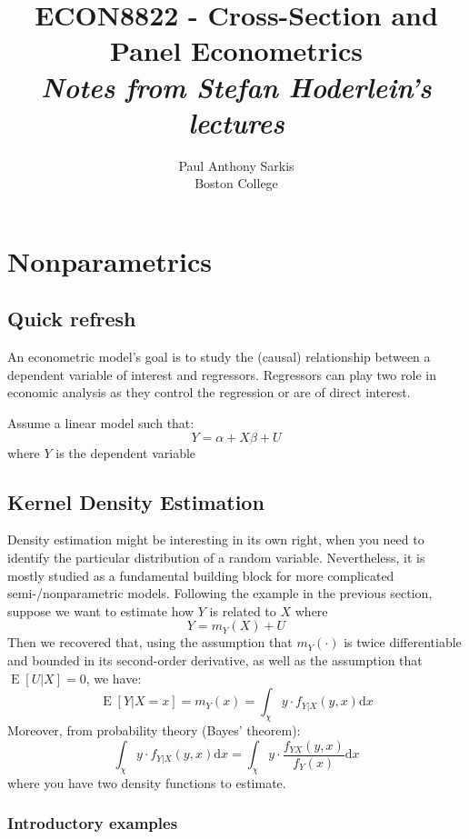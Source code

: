 \documentclass[12pt]{report}
\def\D{\mathrm{d}}
\newcommand{\E}[1]{\operatorname{E}\left[#1\right]}
\def\D{\mathrm{d}}
\def\D{\mathrm{d}}
\begin{document}
\date{}
\title{\textbf{\huge{ECON8822 - Cross-Section and Panel Econometrics}}\\ \textit{Notes from Stefan Hoderlein's lectures}}
\author{Paul Anthony Sarkis\\ Boston College} 
 
\maketitle

\tableofcontents

\chapter{Nonparametrics}

\section{Quick refresh}

An econometric model's goal is to study the (causal) relationship between a dependent variable of interest and regressors. Regressors can play two role in economic analysis as they control the regression or are of direct interest.

Assume a linear model such that: $$Y = \alpha + X\beta + U $$ where $Y$ is the dependent variable 

\section{Kernel Density Estimation}

Density estimation might be interesting in its own right, when you need to identify the particular distribution of a random variable. Nevertheless, it is mostly studied as a fundamental building block for more complicated semi-/nonparametric models. Following the example in the previous section, suppose we want to estimate how $Y$ is related to $X$ where $$ Y = m_Y(X) + U $$ Then we recovered that, using the assumption that $m_Y(\cdot)$ is twice differentiable and bounded in its second-order derivative, as well as the assumption that $\E{U\vert X} = 0$, we have: $$\E{Y\vert X = x} = m_Y(x) = \int_\chi y\cdot f_{Y\vert X}(y, x)\D x $$ Moreover, from probability theory (Bayes' theorem): $$ \int_\chi y\cdot f_{Y\vert X}(y, x)\D x = \int_\chi y\cdot \frac{f_{YX}(y, x)}{f_{Y}(x)} \D x$$ where you have two density functions to estimate.

\subsection{Introductory examples}
\end{document}
